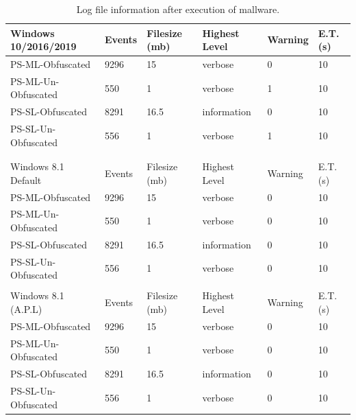 \documentclass{article}%
\begin{document}
\begin{table}
\caption {Log file information after execution of mallware.}
\label{tab:table_six}
\begin{center}
\begin{tabular}{|l|l|l|l|l|l|}
\hline
Windows 10/2016/2019 & Events & Filesize (mb) & Highest Level & Warning & E.T. (s)  \\\hline
PS-ML-Obfuscated     & 9296   & 15              & verbose       & 0       & 10               \\\hline
PS-ML-Un-Obfuscated  & 550    & 1               & verbose       & 1       & 10               \\\hline
PS-SL-Obfuscated     & 8291   & 16.5            & information   & 0       & 10               \\\hline
PS-SL-Un-Obfuscated  & 556    & 1               & verbose       & 1       & 10               \\\hline
                     &        &                 &               &         &                  \\\hline
                     &        &                 &               &         &                  \\\hline
Windows 8.1 Default  & Events & Filesize (mb) & Highest Level & Warning & E.T. (s)  \\\hline
PS-ML-Obfuscated     & 9296   & 15              & verbose       & 0       & 10               \\\hline
PS-ML-Un-Obfuscated  & 550    & 1               & verbose       & 0       & 10               \\\hline
PS-SL-Obfuscated     & 8291   & 16.5            & information   & 0       & 10               \\\hline
PS-SL-Un-Obfuscated  & 556    & 1               & verbose       & 0       & 10               \\\hline
                     &        &                 &               &         &                  \\\hline
Windows 8.1 (A.P.L)  & Events & Filesize (mb) & Highest Level & Warning & E.T. (s)  \\\hline
PS-ML-Obfuscated     & 9296   & 15              & verbose       & 0       & 10               \\\hline
PS-ML-Un-Obfuscated  & 550    & 1               & verbose       & 0       & 10               \\\hline
PS-SL-Obfuscated     & 8291   & 16.5            & information   & 0       & 10               \\\hline
PS-SL-Un-Obfuscated  & 556    & 1               & verbose       & 0       & 10               \\\hline
\end{tabular}
\end{center}
\end{table}
\end{document}
